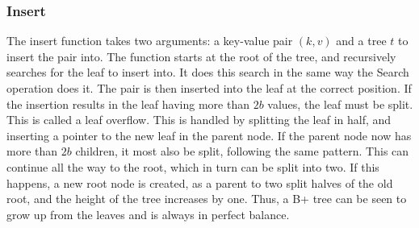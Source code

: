 \subsubsection{Insert}
The insert function takes two arguments: a key-value pair $(k, v)$ and a tree $t$ to insert the pair into. The function starts at the root of the tree, and recursively searches for the leaf to insert into. It does this search in the same way the Search operation does it. The pair is then inserted into the leaf at the correct position. If the insertion results in the leaf having more than $2b$ values, the leaf must be split. This is called a leaf overflow. This is handled by splitting the leaf in half, and inserting a pointer to the new leaf in the parent node. If the parent node now has more than $2b$ children, it most also be split, following the same pattern. This can continue all the way to the root, which in turn can be split into two. If this happens, a new root node is created, as a parent to two split halves of the old root, and the height of the tree increases by one. Thus, a B+ tree can be seen to grow up from the leaves and is always in perfect balance.






